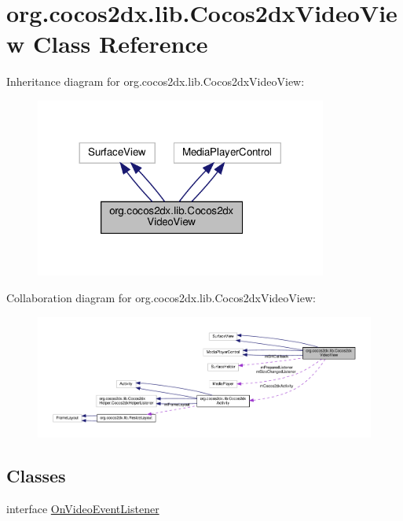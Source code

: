 \hypertarget{classorg_1_1cocos2dx_1_1lib_1_1Cocos2dxVideoView}{}\section{org.\+cocos2dx.\+lib.\+Cocos2dx\+Video\+View Class Reference}
\label{classorg_1_1cocos2dx_1_1lib_1_1Cocos2dxVideoView}


Inheritance diagram for org.\+cocos2dx.\+lib.\+Cocos2dx\+Video\+View\+:
\nopagebreak
\begin{figure}[H]
\begin{center}
\leavevmode
\includegraphics[width=272pt]{classorg_1_1cocos2dx_1_1lib_1_1Cocos2dxVideoView__inherit__graph}
\end{center}
\end{figure}


Collaboration diagram for org.\+cocos2dx.\+lib.\+Cocos2dx\+Video\+View\+:
\nopagebreak
\begin{figure}[H]
\begin{center}
\leavevmode
\includegraphics[width=350pt]{classorg_1_1cocos2dx_1_1lib_1_1Cocos2dxVideoView__coll__graph}
\end{center}
\end{figure}
\subsection*{Classes}
\begin{DoxyCompactItemize}
\item 
interface \hyperlink{interfaceorg_1_1cocos2dx_1_1lib_1_1Cocos2dxVideoView_1_1OnVideoEventListener}{On\+Video\+Event\+Listener}
\end{DoxyCompactItemize}
